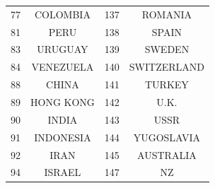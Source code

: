 \documentclass{scrartcl}
\begin{document}
\begin{table}[h!]
\begin{center}
\begin{tabular}{|l|c|l|c|}
77& COLOMBIA    &       137 &ROMANIA    \\
81& PERU        &       138 &SPAIN       \\
83& URUGUAY     &       139 &SWEDEN      \\
84& VENEZUELA   &       140 &SWITZERLAND     \\
88& CHINA       &       141 &TURKEY      \\
89& HONG KONG   &       142 &U.K.        \\
90& INDIA       &       143 &USSR        \\
91& INDONESIA   &       144 &YUGOSLAVIA  \\
92& IRAN        &       145 &AUSTRALIA   \\
94& ISRAEL      &       147 &NZ      \\
\hline
\end{tabular}
\end{center}
\end{table}



\end{document}
